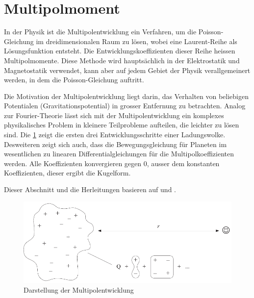 %
%
%
%
\section{Multipolmoment
\label{planet:section:multipol}}
In der Physik ist die Multipolentwicklung ein Verfahren, um die Poisson-Gleichung im dreidimensionalen Raum zu lösen, wobei eine Laurent-Reihe als Lösungsfunktion entsteht.
%
%
Die Entwicklungskoeffizienten dieser Reihe heissen Multipolmomente.
Diese Methode wird hauptsächlich in der Elektrostatik und Magnetostatik verwendet, kann aber auf jedem Gebiet der Physik verallgemeinert werden, in dem die Poisson-Gleichung auftritt.

Die Motivation der Multipolentwicklung liegt darin, das Verhalten von beliebigen Potentialen (Gravitationspotential) in grosser Entfernung zu betrachten.
Analog zur Fourier-Theorie lässt sich mit der Multipolentwicklung ein komplexes physikalisches Problem in kleinere Teilprobleme aufteilen, die leichter zu lösen sind.
Die \cref{planet:fig:multipol} zeigt die ersten drei Entwicklungsschritte einer Ladungswolke.
Desweiteren zeigt sich auch, dass die Bewegungsgleichung für Planeten im wesentlichen zu linearen Differentialgleichungen für die Multipolkoeffizienten werden.
Alle Koeffizienten konvergieren gegen 0, ausser dem konstanten Koeffizienten, dieser ergibt die Kugelform.

Dieser Abschnitt und die Herleitungen basieren auf \cite{planet:multi} und \cite{planet:quadro}.

\begin{figure}
    \centering
    \includegraphics[width=\linewidth]{papers/planet/pictures/Multipol.pdf}
    \caption{Darstellung der Multipolentwicklung
        \label{planet:fig:multipol}}
\end{figure}

